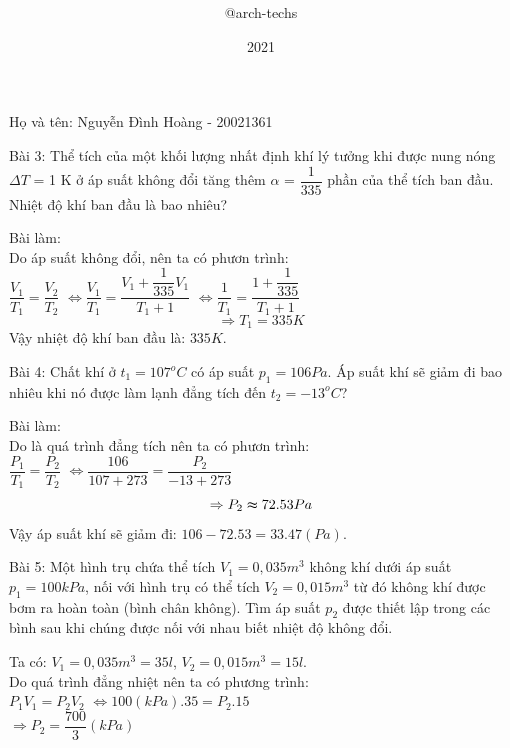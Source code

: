 \documentclass[12pt,a4paper]{report}
\title{\framebox {
        \textcolor{TEcolor}{
            \Huge {    AP/College Physics 1    }
        }
    }    }
\author{\Large @arch-techs}
\date{2021}
\begin{document}
{\selectfont

\begin{center}
    \framebox{
      \Large \textcolor{TEcolor}{BTVN: Chương 5: Nhiệt Động Lực Học Chất Khí}
}
\newline

      \textcolor{TEcolor}{Họ và tên: Nguyễn Đình Hoàng - 20021361}
\end{center}

Bài 3: Thể tích của một khối lượng nhất định khí lý tưởng khi được nung nóng
$\varDelta T$ = 1 K ở áp suất không đổi tăng thêm $\alpha $ = $\dfrac{1}{335}$ phần của thể tích ban đầu.
Nhiệt độ khí ban đầu là bao nhiêu?
\begin{center}
    Bài làm: \\
    Do áp suất không đổi, nên ta có phươn trình: \\
    $\dfrac{V_{1}}{T_{1}} = \dfrac{V_{2}}{T_{2}}$
    $\Leftrightarrow  \dfrac{V_{1}}{T_{1}} = \dfrac{V_{1} + \dfrac{1}{335}V_{1}}{T_{1} + 1}$
    $\Leftrightarrow  \dfrac{1}{T_{1}} = \dfrac{1 + \dfrac{1}{335}}{T_{1} + 1}$
    \[\Rightarrow T_{1} = 335K\] 
    Vậy nhiệt độ khí ban đầu là: $335K$.

\end{center}

Bài 4: Chất khí ở $t_{1} = 107^o C $ có áp suất $p_{1} = 106 Pa.$ Áp suất khí sẽ giảm đi bao
nhiêu khi nó được làm lạnh đẳng tích đến $t_{2} = -13^o C$?
\begin{center}
    Bài làm: \\
    Do là quá trình đẳng tích nên ta có phươn trình: \\
    $\dfrac{P_{1}}{T_{1}} = \dfrac{P_{2}}{T_{2}}$
    $\Leftrightarrow  \dfrac{106}{107 + 273} = \dfrac{P_{2}}{-13 + 273}$
    \[\Rightarrow P_{2} \thickapprox 72.53Pa\] 
    Vậy áp suất khí sẽ giảm đi: $106 - 72.53 = 33.47 (Pa)$.

\end{center}

Bài 5: Một hình trụ chứa thể tích $V_{1} = 0,035 m^3$ không khí dưới áp suất $p_{1} = 100kPa$, nối với hình trụ có thể tích $V_{2} = 0,015 m^3$
từ đó không khí được bơm ra hoàn toàn (bình chân không). Tìm áp suất $p_{2}$ được thiết lập trong các bình sau
khi chúng được nối với nhau biết nhiệt độ không đổi.

\begin{center}
    Ta có: $V_{1} = 0,035 m^3 = 35l$, $V_{2} = 0,015 m^3 = 15l$. \\
    Do quá trình đẳng nhiệt nên ta có phương trình: \\
    $P_{1}V_{1} = P_{2}V_{2}$
    $\Leftrightarrow 100(kPa).35 = P_{2}.15$ \\
    $\Rightarrow P_{2} = \dfrac{700}{3} (kPa)$
\end{center}

}
\end{document}

